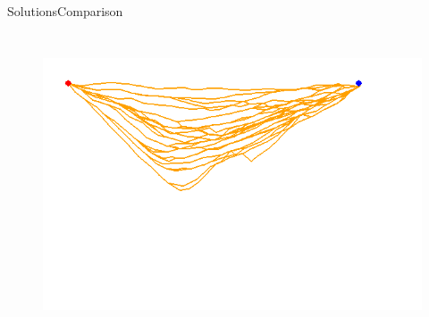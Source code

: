 \begin{frame}{Solutions}{Comparison}
\begin{columns}
\begin{figure}
		\includegraphics[width=\linewidth]{figure/sim2-2obj/MORRTstar00-ALL.png}
		\label{fig:sim:01:sol3}
	\end{figure}
\end{columns}
\end{frame}

